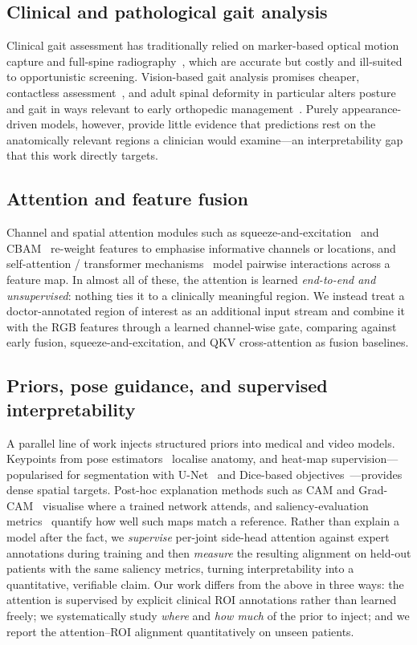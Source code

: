 \documentclass[review,authoryear,times]{elsarticle}
\begin{document}
\subsection{Clinical and pathological gait analysis}
Clinical gait assessment has traditionally relied on marker-based optical motion
capture and full-spine radiography~\citep{motioncapture_gait}, which are accurate
but costly and ill-suited to opportunistic screening. Vision-based gait analysis
promises cheaper, contactless assessment~\citep{clinical_gait_review}, and adult
spinal deformity in particular alters posture and gait in ways relevant to early
orthopedic management~\citep{asd_clinical_review}. Purely appearance-driven models,
however, provide little evidence that predictions rest on the anatomically
relevant regions a clinician would examine---an interpretability gap that this
work directly targets.

\subsection{Attention and feature fusion}
Channel and spatial attention modules such as
squeeze-and-excitation~\citep{hu2018senet} and {CBAM}~\citep{woo2018cbam} re-weight
features to emphasise informative channels or locations, and self-attention /
transformer mechanisms~\citep{vaswani2017attention,dosovitskiy2021vit} model
pairwise interactions across a feature map. In almost all of these, the attention
is learned \emph{end-to-end and unsupervised}: nothing ties it to a clinically
meaningful region. We instead treat a doctor-annotated region of interest as an
additional input stream and combine it with the RGB features through a learned
channel-wise gate, comparing against early fusion, squeeze-and-excitation, and
{QKV} cross-attention as fusion baselines.

\subsection{Priors, pose guidance, and supervised interpretability}
A parallel line of work injects structured priors into medical and video models.
Keypoints from pose estimators~\citep{cao2017openpose,sun2019hrnet} localise
anatomy, and heat-map supervision---popularised for segmentation with
{U-Net}~\citep{ronneberger2015unet} and Dice-based
objectives~\citep{milletari2016vnet}---provides dense spatial targets. Post-hoc
explanation methods such as {CAM} and {Grad-CAM}~\citep{zhou2016cam,selvaraju2017gradcam}
visualise where a trained network attends, and saliency-evaluation
metrics~\citep{judd2009learning,bylinskii2019metrics} quantify how well such maps
match a reference. Rather than explain a model after the fact, we \emph{supervise}
per-joint side-head attention against expert annotations during training and then
\emph{measure} the resulting alignment on held-out patients with the same
saliency metrics, turning interpretability into a quantitative, verifiable claim.
Our work differs from the above in three ways: the attention is supervised by
explicit clinical ROI annotations rather than learned freely; we systematically
study \emph{where} and \emph{how much} of the prior to inject; and we report the
attention--ROI alignment quantitatively on unseen patients.
\end{document}
